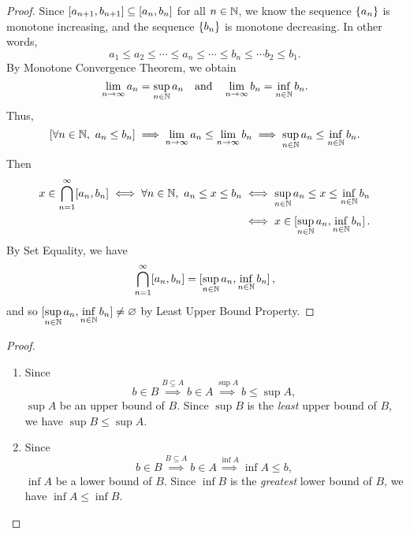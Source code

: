 \documentclass[11pt,openany]{article}
\begin{document}
\begin{proof}
	Since $\intcc{a_{n+1},b_{n+1}}\subseteq\intcc{a_n,b_n}$ for all $n\in\mathbb{N}$, we know  the sequence $\set{a_n}$ is monotone increasing, and the sequence $\set{b_n}$ is monotone decreasing. In other words, \[
	a_1\leq a_2\leq\cdots\leq a_n\leq \cdots\leq b_n\leq\cdots b_2\leq b_1.
	\] By Monotone Convergence Theorem, we obtain \[
	\lim\limits_{n\to\infty}a_n=\sup_{n\in\mathbb{N}} a_n\quad\text{and}\quad\lim\limits_{n\to\infty}b_n=\inf\limits_{n\in\mathbb{N}}b_n.
	\] 
	Thus, \[
	[\forall n\in\mathbb{N},\ a_n\leq b_n]\implies \lim\limits_{n\to\infty}a_n\leq\lim\limits_{n\to\infty}b_n\\
	\implies\sup\limits_{n\in\mathbb{N}} a_n\leq\inf\limits_{n\in\mathbb{N}} b_n.
	\]
Then \begin{align*}
x\in\bigcap_{n=1}^\infty[a_n,b_n]\iff \forall n\in\N,\ a_n\leq x\leq b_n
&\iff \sup\limits_{n\in\N} a_n\leq x\leq \inf\limits_{n\in\N} b_n\\
&\iff x\in\intcc[0]{\sup\limits_{n\in\N} a_n, \inf\limits_{n\in\N} b_n}.
\end{align*} By Set Equality, we have \[
\bigcap_{n=1}^\infty[a_n,b_n]=\intcc[0]{\sup\limits_{n\in\N} a_n, \inf\limits_{n\in\N} b_n},
\] and so $\intcc[0]{\sup\limits_{n\in\N} a_n, \inf\limits_{n\in\N} b_n}\neq\varnothing$ by Least Upper Bound Property.
\end{proof}

\newpage\noindent
{}
\begin{proof}
\begin{enumerate}[(1)]
	\item Since \[
	b\in B\overset{B\subseteq A}{\implies}b\in A\overset{\sup A}{\implies}b\leq \sup A,
	\] $\sup A$ be an upper bound of $B$. Since $\sup B$ is the \textit{least} upper bound of $B$, we have $\sup B\leq\sup A$.
	\item Since \[
	b\in B\overset{B\subseteq A}{\implies}b\in A\overset{\inf A}{\implies}\inf A\leq b,
	\] $\inf A$ be a lower bound of $B$. Since $\inf B$ is the \textit{greatest} lower bound of $B$, we have $\inf A\leq\inf B$.
\end{enumerate}
\end{proof}
\end{document}
